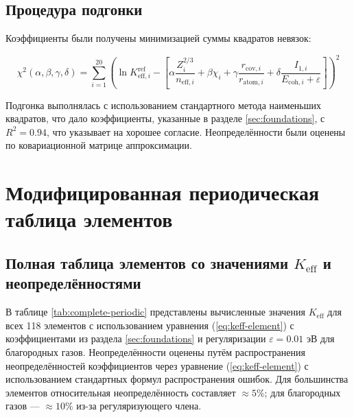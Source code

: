 \documentclass[12pt,a4paper]{article}
\theoremstyle{remark}
\newcommand{\Keff}{K_{\mathrm{eff}}}
\begin{document}
	\subsection{Процедура подгонки}
	
	Коэффициенты были получены минимизацией суммы квадратов невязок:
	
	\begin{equation}
		\chi^2(\alpha,\beta,\gamma,\delta) = \sum_{i=1}^{20} \left( \ln K_{\mathrm{eff},i}^{\text{ref}} - \left[ \alpha \frac{Z_i^{2/3}}{n_{\text{eff},i}} + \beta \chi_i + \gamma \frac{r_{\text{cov},i}}{r_{\text{atom},i}} + \delta \frac{I_{1,i}}{E_{\text{coh},i} + \varepsilon} \right] \right)^2
		\label{eq:chi2}
	\end{equation}
	
	Подгонка выполнялась с использованием стандартного метода наименьших квадратов, что дало коэффициенты, указанные в разделе \ref{sec:foundations}, с $R^2 = 0.94$, что указывает на хорошее согласие. Неопределённости были оценены по ковариационной матрице аппроксимации.
	
	\section{Модифицированная периодическая таблица элементов}
	\label{sec:periodic-table}
	
	\subsection{Полная таблица элементов со значениями $\Keff$ и неопределённостями}
	
	В таблице \ref{tab:complete-periodic} представлены вычисленные значения $\Keff$ для всех 118 элементов с использованием уравнения (\ref{eq:keff-element}) с коэффициентами из раздела \ref{sec:foundations} и регуляризации $\varepsilon = 0.01$ эВ для благородных газов. Неопределённости оценены путём распространения неопределённостей коэффициентов через уравнение (\ref{eq:keff-element}) с использованием стандартных формул распространения ошибок. Для большинства элементов относительная неопределённость составляет $\approx 5\%$; для благородных газов — $\approx 10\%$ из-за регуляризующего члена.
	
\end{document}
